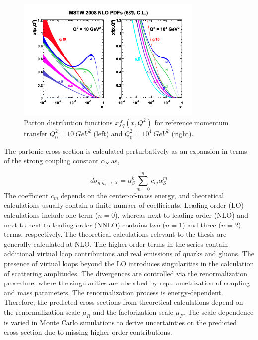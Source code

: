 \begin{figure}[!htb]
\centering
    \includegraphics[width=0.8\textwidth] {figures/Theory/PDF.pdf}\hspace{1cm}
    \caption{ Parton distribution functions $xf_{q}(x,Q^2)$ for reference momentum transfer $Q^2_{0} = 10 ~ GeV^2$ (left) and $Q^2_{0} = 10^4~ GeV^{2}$ (right).\cite{PDFCalLHC}.}
\label{fig:PDFFig}
\end{figure}

The partonic cross-section is calculated perturbatively as an expansion in terms of the strong coupling constant $\alpha_{S}$ as,

\begin{equation}
\label{eqn:PartonicXS}
d\sigma_{q_{1}q_{2}\rightarrow X} = \alpha_{S}^{k} \sum_{m=0}^{n} c_{m}\alpha_{S}^{m}
\end{equation}
The coefficient $c_{m}$ depends on the center-of-mass energy, and theoretical calculations usually contain a finite number of coefficients. Leading order (LO) calculations include one term ($n=0$), whereas next-to-leading order (NLO) and next-to-next-to-leading order (NNLO) contains two ($n=1$) and three ($n=2$) terms, respectively. The theoretical calculations relevant to the thesis are generally calculated at NLO. The higher-order terms in the series contain additional virtual loop contributions and real emissions of quarks and gluons. The presence of virtual loops beyond the LO introduces singularities in the calculation of scattering amplitudes. The divergences are controlled via the renormalization procedure, where the singularities are absorbed by reparametrization of coupling and mass parameters. The renormalization process is energy-dependent. Therefore, the predicted cross-sections from theoretical calculations depend on the renormalization scale $\mu_{R}$ and the factorization scale $\mu_{F}$. The scale dependence is varied in Monte Carlo simulations to derive uncertainties on the predicted cross-section due to missing higher-order contributions. 

